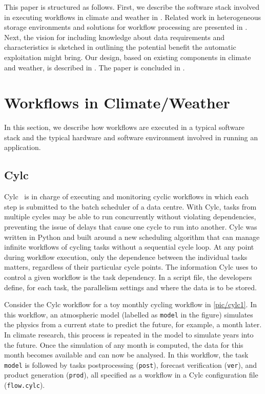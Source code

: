\documentclass{superfri}
\begin{document}
This paper is structured as follows.
First, we describe the software stack involved in executing workflows in climate and weather in .
Related work in heterogeneous storage environments and solutions for workflow processing are presented in .
Next, the vision for including knowledge about data requirements and characteristics is sketched in  outlining the potential benefit the automatic exploitation might bring.
Our design, based on existing components in climate and weather, is described in .
The paper is concluded in .

\section{Workflows in Climate/Weather}
\label{sec:workflows}

In this section, we describe how workflows are executed in a typical software stack and the typical hardware and software environment involved in running an application.

\subsection{Cylc}

Cylc~\cite{8675433} is in charge of executing and monitoring cyclic workflows in which each step is submitted to the batch scheduler of a data centre.
With Cylc, tasks from multiple cycles may be able to run concurrently without violating dependencies, preventing the issue of delays that cause one cycle to run into another.
Cylc was written in Python and built around a new scheduling algorithm that can manage infinite workflows of cycling tasks without a sequential cycle loop.
At any point during workflow execution, only the dependence between the individual tasks matters, regardless of their particular cycle points.
The information Cylc uses to control a given workflow is the task dependency.
In a script file, the developers define, for each task, the parallelism settings and where the data is to be stored.


Consider the Cylc workflow for a toy monthly cycling workflow in \cref{pic/cylc1}.
In this workflow, an atmospheric model (labelled as \texttt{model} in the figure) simulates the physics from a current state to predict the future, for example, a month later.
In climate research, this process is repeated in the model to simulate years into the future.
Once the simulation of any month is computed, the data for this month becomes available and can now be analysed.
In this workflow, the task \texttt{model} is followed by tasks postprocessing (\texttt{post}), forecast verification (\texttt{ver}), and product generation (\texttt{prod}), all specified as a workflow in a Cylc configuration file (\texttt{flow.cylc}).
\end{document}
